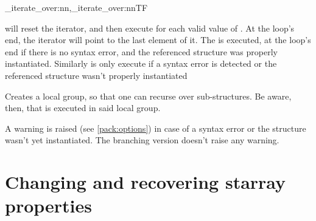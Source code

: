 \documentclass[10pt]{article}
\begin{document}
\begin{codedescribe}[code,new=2023/11/04]{\starray_iterate_over:nn,\starray_iterate_over:nnTF}
\begin{codesyntax}%
\end{codesyntax}
 will reset the  iterator, and then execute  for each valid value of . At the loop's end, the  iterator will point to the last element of it. The  is executed, at the loop's end if there is no syntax error, and the referenced structure was properly instantiated. Similarly  is only execute if a syntax error is detected or the referenced structure wasn't properly instantiated
\end{codedescribe}
\begin{tsremark}
 Creates a local group, so that one can recurse over sub-structures. Be aware, then, that  is executed in said local group.
\end{tsremark}
\begin{tsremark}
A warning is raised (see \ref{pack:options}) in case of a  syntax error or the structure wasn't yet instantiated. The branching version doesn't raise any warning.
\end{tsremark}



\section{Changing and recovering starray properties}\label{pack:get/set}
\end{document}
